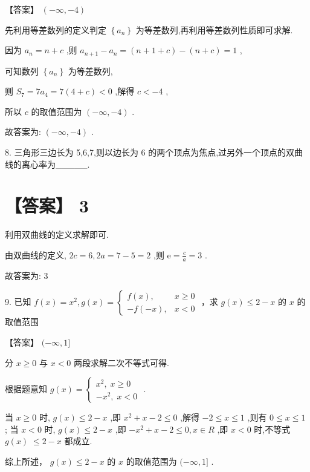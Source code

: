 \documentclass[10pt]{article}
\begin{document}
【答案】 \(\left( {-\infty , - 4}\right)\)

先利用等差数列的定义判定 \(\left\{  {a}_{n}\right\}\) 为等差数列,再利用等差数列性质即可求解.

因为 \({a}_{n} = n + c\) ,则 \({a}_{n + 1} - {a}_{n} = \left( {n + 1 + c}\right)  - \left( {n + c}\right)  = 1\) ,

可知数列 \(\left\{  {a}_{n}\right\}\) 为等差数列,

则 \({S}_{7} = 7{a}_{4} = 7\left( {4 + c}\right)  < 0\) ,解得 \(c <  - 4\) ,

所以 \(c\) 的取值范围为 \(\left( {-\infty , - 4}\right)\) .

故答案为: \(\left( {-\infty , - 4}\right)\) .

8. 三角形三边长为 5,6,7,则以边长为 6 的两个顶点为焦点,过另外一个顶点的双曲线的离心率为\_\_\_\_\_.

\section*{【答案】 3}

利用双曲线的定义求解即可.

由双曲线的定义, \({2c} = 6,{2a} = 7 - 5 = 2\) ,则 \(\mathrm{e} = \frac{c}{a} = 3\) .

故答案为: 3

9. 已知 \(f\left( x\right)  = {x}^{2},g\left( x\right)  = \left\{  \begin{array}{ll} f\left( x\right) , & x \geq  0 \\   - f\left( {-x}\right) , & x < 0 \end{array}\right.\) ，求 \(g\left( x\right)  \leq  2 - x\) 的 \(x\) 的取值范围

【答案】 \(( - \infty ,1\rbrack\)

分 \(x \geq  0\) 与 \(x < 0\) 两段求解二次不等式可得.

根据题意知 \(g\left( x\right)  = \left\{  \begin{array}{l} {x}^{2},\;x \geq  0 \\   - {x}^{2},\;x < 0 \end{array}\right.\) .

当 \(x \geq  0\) 时, \(g\left( x\right)  \leq  2 - x\) ,即 \({x}^{2} + x - 2 \leq  0\) ,解得 \(- 2 \leq  x \leq  1\) ,则有 \(0 \leq  x \leq  1\) ; 当 \(x < 0\) 时, \(g\left( x\right)  \leq  2 - x\) ,即 \(- {x}^{2} + x - 2 \leq  0,x \in  R\) ,即 \(x < 0\) 时,不等式 \(g\left( x\right) \; \leq  2 - x\) 都成立.

综上所述， \(g\left( x\right)  \leq  2 - x\) 的 \(x\) 的取值范围为 \(( - \infty ,1\rbrack\) .
\end{document}

